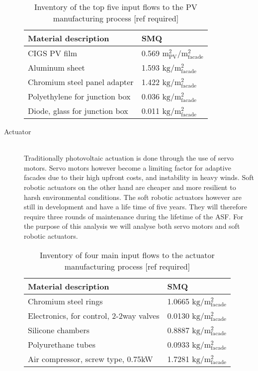 \begin{description}
\begin{table}[H]
\centering
\begin{tabular}{ll}
\hline
Material description & SMQ \\ \hline
CIGS PV film       	 & 0.569 ${\mathrm{m^2_{PV}/m^2_{facade}}}$\\
Aluminum sheet 	 & 1.593 ${\mathrm{kg/m^2_{facade}}}$\\
Chromium steel panel adapter  & 1.422 ${\mathrm{kg/m^2_{facade}}}$\\
Polyethylene for junction box & 0.036 ${\mathrm{kg/m^2_{facade}}}$\\
Diode, glass for junction box & 0.011 ${\mathrm{kg/m^2_{facade}}}$\\
\hline
\end{tabular}
\caption{Inventory of the top five input flows to the PV manufacturing process [ref required]}
\label{tab:PVinv}
\end{table}

\item[Actuator] \hfill \\
Traditionally photovoltaic actuation is done through the use of servo motors. Servo motors however become a limiting factor for adaptive facades due to their high upfront costs, and instability in heavy winds. Soft robotic actuators on the other hand are cheaper and more resilient to harsh environmental conditions\cite{Svetozarevic2014a}. The soft robotic actuators however are still in development and have a life time of five years. They will therefore require three rounds of maintenance during the lifetime of the ASF.
For the purpose of this analysis we will analyse both servo motors and soft robotic actuators. 

\begin{table}[H]
\centering
\begin{tabular}{ll}
\hline
Material description & SMQ \\ \hline
Chromium steel rings	 & 1.0665 ${\mathrm{kg/m^2_{facade}}}$ \\
Electronics, for control, 2-2way valves  & 0.0130  ${\mathrm{kg/m^2_{facade}}}$\\
Silicone chambers & 0.8887 ${\mathrm{kg/m^2_{facade}}}$\\
Polyurethane tubes &0.0933 ${\mathrm{kg/m^2_{facade}}}$\\
Air compressor, screw type, 0.75kW & 1.7281 ${\mathrm{kg/m^2_{facade}}}$\\
\hline
\end{tabular}
\caption{Inventory of four main input flows to the actuator manufacturing process [ref required]}
\label{tab:ActuatorInv}
\end{table}


\end{description}
